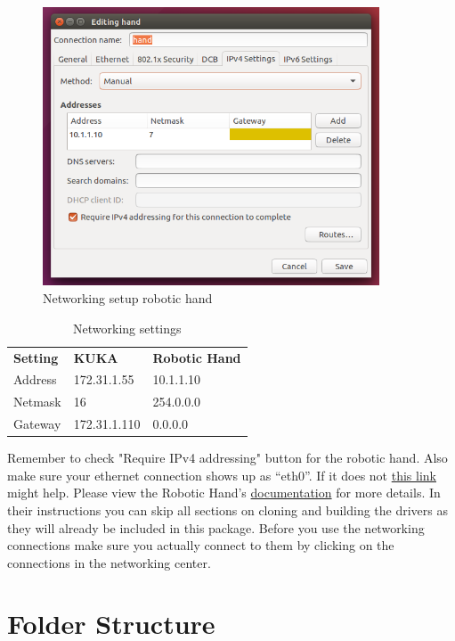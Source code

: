 \documentclass[headsepline,footinclude=false,fontsize=11pt,paper=a4,listof=totoc,bibliography=totoc,BCOR=12mm,DIV=14]{scrbook}
\begin{document}
\begin{figure}[h!]
    \centering
    \includegraphics[width=10cm]{figures/network_hand}
    \caption{Networking setup robotic hand}
    \label{fig:net_hand}
\end{figure}

\newpage
\begin{table}[h]
\centering
\begin{tabular}{lll}
\textbf{Setting} & \textbf{KUKA} & \textbf{Robotic Hand} \\
Address          & 172.31.1.55   & 10.1.1.10             \\
Netmask          & 16            & 254.0.0.0             \\
Gateway          & 172.31.1.110  & 0.0.0.0              
\end{tabular}
\caption{Networking settings}
\label{tab:net}
\end{table}

Remember to check "Require IPv4 addressing" button for the robotic hand. Also make sure your ethernet connection shows up as ``eth0''. If it does not \href{https://askubuntu.com/questions/767786/changing-network-interfaces-name-ubuntu-16-04}{this link} might help. Please view the Robotic Hand's \href{https://www.labs.righthandrobotics.com/reflex-quickstart}{documentation} for more details. In their instructions you can skip all sections on cloning and building the drivers as they will already be included in this package. Before you use the networking connections make sure you actually connect to them by clicking on the connections in the networking center.


\section{Folder Structure}
\end{document}
